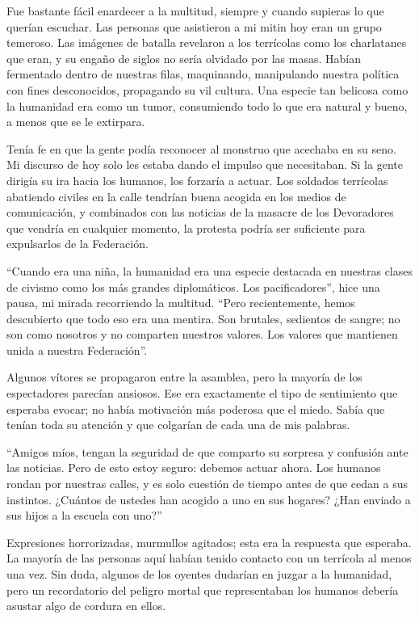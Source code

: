 \documentclass[spanish,12pt,a4paper,oneside,titlepage]{book}
\begin{document}
    Fue bastante fácil enardecer a la multitud, siempre y cuando supieras lo que querían escuchar. Las personas que asistieron a mi mitin hoy eran un grupo temeroso. Las imágenes de batalla revelaron a los terrícolas como los charlatanes que eran, y su engaño de siglos no sería olvidado por las masas. Habían fermentado dentro de nuestras filas, maquinando, manipulando nuestra política con fines desconocidos, propagando su vil cultura. Una especie tan belicosa como la humanidad era como un tumor, consumiendo todo lo que era natural y bueno, a menos que se le extirpara.

    Tenía fe en que la gente podía reconocer al monstruo que acechaba en su seno. Mi discurso de hoy solo les estaba dando el impulso que necesitaban. Si la gente dirigía su ira hacia los humanos, los forzaría a actuar. Los soldados terrícolas abatiendo civiles en la calle tendrían buena acogida en los medios de comunicación, y combinados con las noticias de la masacre de los Devoradores que vendría en cualquier momento, la protesta podría ser suficiente para expulsarlos de la Federación.

    ``Cuando era una niña, la humanidad era una especie destacada en nuestras clases de civismo como los más grandes diplomáticos. Los pacificadores'', hice una pausa, mi mirada recorriendo la multitud. ``Pero recientemente, hemos descubierto que todo eso era una mentira. Son brutales, sedientos de sangre; no son como nosotros y no comparten nuestros valores. Los valores que mantienen unida a nuestra Federación''.

    Algunos vítores se propagaron entre la asamblea, pero la mayoría de los espectadores parecían ansiosos. Ese era exactamente el tipo de sentimiento que esperaba evocar; no había motivación más poderosa que el miedo. Sabía que tenían toda su atención y que colgarían de cada una de mis palabras.

    ``Amigos míos, tengan la seguridad de que comparto su sorpresa y confusión ante las noticias. Pero de esto estoy seguro: debemos actuar ahora. Los humanos rondan por nuestras calles, y es solo cuestión de tiempo antes de que cedan a sus instintos. ¿Cuántos de ustedes han acogido a uno en sus hogares? ¿Han enviado a sus hijos a la escuela con uno?''

    Expresiones horrorizadas, murmullos agitados; esta era la respuesta que esperaba. La mayoría de las personas aquí habían tenido contacto con un terrícola al menos una vez. Sin duda, algunos de los oyentes dudarían en juzgar a la humanidad, pero un recordatorio del peligro mortal que representaban los humanos debería asustar algo de cordura en ellos.
\end{document}
